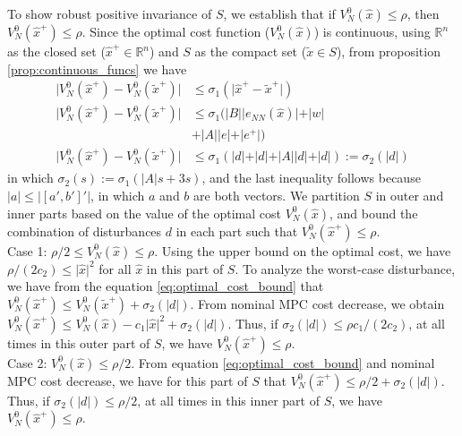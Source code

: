 \documentclass[preprint,5p, twocolumn, authoryear]{elsarticle}
\newcommand{\bbR}{\mathbb{R}}
\begin{document}
To show robust positive invariance of $S$,  
we establish that if $V_N^0(\hat{x}) \leq \rho$, 
then $V_N^0(\hat{x}^+) \leq \rho$.
Since the optimal 
cost function ($V_N^0(\hat{x})$) is continuous,
using $\bbR^n$ as the closed set ($\hat{x}^+ \in \bbR^n$) 
and $S$ as the compact set ($\tilde{x} \in S$),
from proposition \ref{prop:continuous_funcs} we have
\begin{align}
    \vert V_N^0(\hat{x}^+) - V_N^0(\tilde{x}^+) \vert &\leq 
    \sigma_1(\vert \hat{x}^+ - \tilde{x}^+ \vert)  \nonumber  \\
    \vert V_N^0(\hat{x}^+) - V_N^0(\tilde{x}^+) \vert &\leq 
   \sigma_1(\vert B \vert\vert e_{NN}(\hat{x}) \vert + \vert w \vert 
   \nonumber \\
   & + \vert A\vert\vert e \vert +  \vert e^+ \vert) \nonumber \\
    \vert V_N^0(\hat{x}^+) - V_N^0(\tilde{x}^+) \vert &\leq 
   \sigma_1(\vert d \vert + \vert d \vert + \vert A \vert\vert d \vert + \vert d \vert) := \sigma_2(\vert d \vert)
   \label{eq:optimal_cost_bound}
\end{align}
in which $\sigma_2(s) := \sigma_1(\vert A\vert s +3s)$, and the last inequality 
follows because $\vert a \vert \leq \vert [a', b']' \vert$, in which $a$ and $b$
are both vectors.
We partition $S$ in outer and inner parts based on 
the value of the optimal cost $V_N^0(\hat{x})$, and bound the 
combination of disturbances $d$ in each part 
such that $V_N^0(\hat{x}^+) \leq \rho$. \\
Case 1: $\rho/2 \leq V_N^0(\hat{x}) \leq \rho $. Using the 
upper bound on the optimal cost, we have 
$\rho/(2c_2) \leq \vert \hat{x} \vert^2$ for all $\hat{x}$ 
in this part of $S$. To analyze the worst-case disturbance, 
we have from the equation \eqref{eq:optimal_cost_bound} that 
$V_N^0(\hat{x}^+) \leq V_N^0(\tilde{x}^+) + \sigma_2(\vert d \vert) $.
From nominal MPC cost decrease, we obtain  
$V_N^0(\hat{x}^+) \leq V_N^0(\hat{x}) - c_1\vert \hat{x} \vert^2 + \sigma_2(\vert d \vert)$. Thus, if $\sigma_2(\vert d \vert) \leq \rho c_1/(2c_2)$, 
at all times in this outer part of $S$, we have 
$V_N^0(\hat{x}^+) \leq \rho$. \\
Case 2: $V_N^0(\hat{x}) \leq \rho/2 $. From 
equation \eqref{eq:optimal_cost_bound} and nominal MPC 
cost decrease, we have for this part of $S$ that 
$V_N^0(\hat{x}^+) \leq \rho/2 + \sigma_2(\vert d \vert)$.
Thus, if $\sigma_2(\vert d \vert) \leq \rho/2$, 
at all times in this inner part of $S$, we have 
$V_N^0(\hat{x}^+) \leq \rho$.
\end{document}
